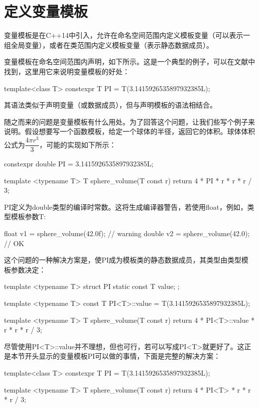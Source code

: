 \section{定义变量模板}
变量模板是在C++14中引入，允许在命名空间范围内定义模板变量（可以表示一组全局变量），或者在类范围内定义模板变量（表示静态数据成员）。

变量模板在命名空间范围内声明，如下所示。这是一个典型的例子，可以在文献中找到，这里用它来说明变量模板的好处：

\begin{cpp}
template<class T>
constexpr T PI = T(3.1415926535897932385L);
\end{cpp}

其语法类似于声明变量（或数据成员），但与声明模板的语法相结合。

随之而来的问题是变量模板有什么用处。为了回答这个问题，让我们些写个例子来说明。假设想要写一个函数模板，给定一个球体的半径，返回它的体积。球体体积公式为$\dfrac{4\pi r^{3}}{3}$，可能的实现如下所示：

\begin{cpp}
constexpr double PI = 3.1415926535897932385L;

template <typename T>
T sphere_volume(T const r)
{
	return 4 * PI * r * r * r / 3;
}
\end{cpp}

PI定义为double类型的编译时常数。这将生成编译器警告，若使用float，例如，类型模板参数T:

\begin{cpp}
float v1 = sphere_volume(42.0f); // warning
double v2 = sphere_volume(42.0); // OK
\end{cpp}

这个问题的一种解决方案是，使PI成为模板类的静态数据成员，其类型由类型模板参数决定：

\begin{cpp}
template <typename T>
struct PI
{
	static const T value;
};

template <typename T>
const T PI<T>::value = T(3.1415926535897932385L);

template <typename T>
T sphere_volume(T const r)
{
	return 4 * PI<T>::value * r * r * r / 3;
}
\end{cpp}

尽管使用PI<T>::value并不理想，但也可行，若可以写成PI<T>就更好了。这正是本节开头显示的变量模板PI可以做的事情，下面是完整的解决方案：

\begin{cpp}
template<class T>
constexpr T PI = T(3.1415926535897932385L);

template <typename T>
T sphere_volume(T const r)
{
	return 4 * PI<T> * r * r * r / 3;
}
\end{cpp}

